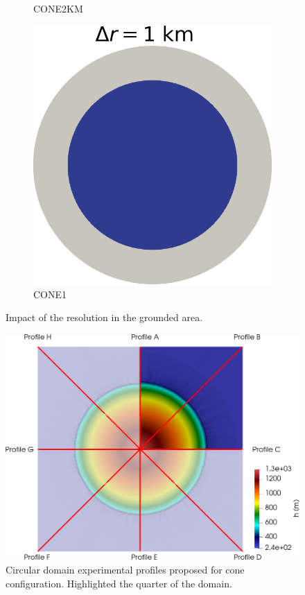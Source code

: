 \documentclass{article}
\begin{document}
\begin{figure}[!h]
\begin{subfigure}{0.25\textwidth}
		\caption{CONE2KM}
		\label{figCONE2}
	\end{subfigure}\hfil %
	\begin{subfigure}{0.25\textwidth}
		\includegraphics[width=\linewidth]{../fig/Grounded_zone_1km_CONE.png}
		\caption{CONE1}
		\label{CONE1KM}
	\end{subfigure}
	\caption{Impact of the resolution in the grounded area.}
	\label{figCONO1}
\end{figure}


\begin{figure}[!h]
	\centering
	\includegraphics[width=0.9\linewidth]{../fig/Profiles_Cone_combined_domains.png}
	\caption{Circular domain experimental profiles proposed for cone configuration. Highlighted the quarter of the domain.}
	\label{profiles}
\end{figure}
\end{document}
